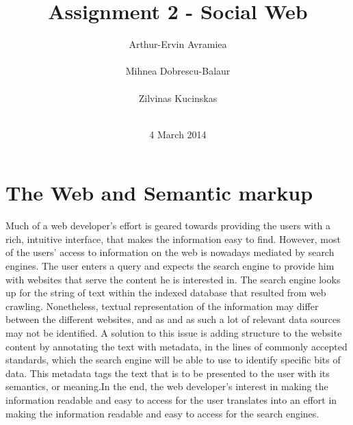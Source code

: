 \documentclass{acm_proc_10ptArticle-sp}
\begin{document}
\title{Assignment 2 - Social Web}

\author{
%
\alignauthor Arthur-Ervin Avramiea\\
       \\
\alignauthor Mihnea Dobrescu-Balaur\\
	\\
\alignauthor Zilvinas Kucinskas\\
	\\
}

\date{4 March 2014}
\maketitle

\section{The Web and Semantic markup}

Much of a web developer's effort is geared towards providing the users with a rich, intuitive interface, that makes the information easy to find. However, most of the users' access to information on the web is nowadays mediated by search engines. The user enters a query and expects the search engine to provide him with websites that serve the content he is interested in. The search engine looks up for the string of text within the indexed database that resulted from web crawling. Nonetheless, textual representation of the information may differ between the different websites, and as and as such a lot of relevant data sources may not be identified. A solution to this issue is adding structure to the website content by annotating the text with metadata, in the lines of commonly accepted standards, which the search engine will be able to use to identify specific bits of data. This metadata tags the text that is to be presented to the user with its semantics, or meaning.In the end, the web developer's interest in making the information readable and easy to access for the user translates into an effort in making the information readable and easy to access for the search engines. 
\end{document}
